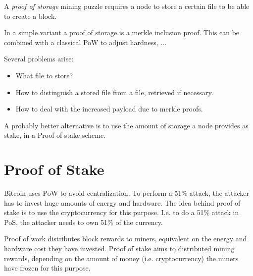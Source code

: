 \begin{definition} A \emph{proof of storage} mining puzzle requires a node to store a certain file to be able to create a block.	
\end{definition}

\begin{note}
In a simple variant a proof of storage is a merkle inclusion proof.
This can be combined with a classical PoW to adjust hardness, ...

Several problems arise:
\begin{itemize}
	\item What file to store? 
	\item How to distinguish a stored file from a file, retrieved if necessary.
	\item How to deal with the increased payload due to merkle proofs.
\end{itemize}
\end{note}

A probably better alternative is to use the amount of storage a node provides as stake, in a Proof of stake scheme.

\section{Proof of Stake}
Bitcoin uses PoW to avoid centralization. To perform a 51\% attack, the attacker has to invest huge amounts of energy and hardware. 
The idea behind proof of stake is to use the cryptocurrency for this purpose. 
I.e. to do a 51\% attack in PoS, the attacker needs to own 51\% of the currency.

\begin{definition}
	Proof of work distributes block rewards to miners, equivalent on the energy and hardware cost they have invested. Proof of stake aims to distributed mining rewards, depending on the amount of money (i.e. cryptocurrency) the miners have frozen for this purpose.
\end{definition}

